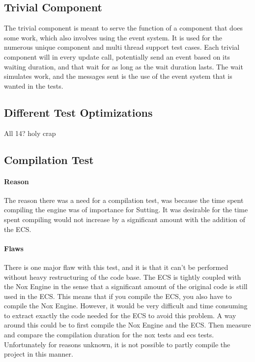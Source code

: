 \subsection{Trivial Component}
The trivial component is meant to serve the function of a component that does some work, which also involves using the event system.
It is used for the numerous unique component and multi thread support test cases.
Each trivial component will in every update call, potentially send an event based on its waiting duration, and that wait for as long as the wait duration lasts.
The wait simulates work, and the messages sent is the use of the event system that is wanted in the tests.


\subsection{Different Test Optimizations}
All 14?
holy crap


\subsection{Compilation Test}

\paragraph{Reason}
The reason there was a need for a compilation test, was because the time spent compiling the engine was of importance for Sutting.
It was desirable for the time spent compiling would not increase by a significant amount with the addition of the ECS.

\paragraph{Flaws}
There is one major flaw with this test, and it is that it can't be performed without heavy restructuring of the code base.
The ECS is tightly coupled with the Nox Engine in the sense that a significant amount of the original code is still used in the ECS.
This means that if you compile the ECS, you also have to compile the Nox Engine.
However, it would be very difficult and time consuming to extract exactly the code needed for the ECS to avoid this problem.
A way around this could be to first compile the Nox Engine and the ECS.
Then measure and compare the compilation duration for the nox tests and ecs tests.
Unfortunately for reasons unknown, it is not possible to partly compile the project in this manner.

